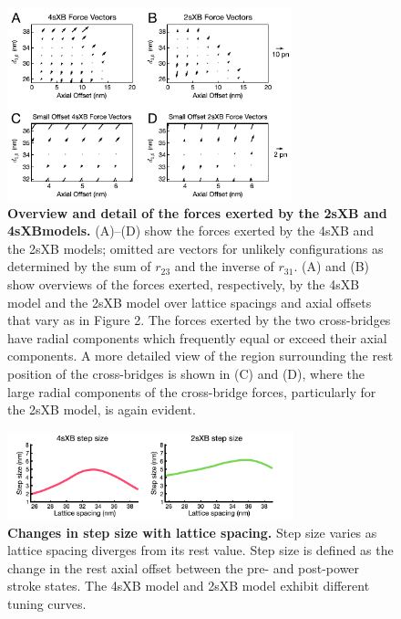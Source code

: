 \documentclass[10pt]{article}
\begin{document}
\clearpage
\begin{figure}[ht]
    \begin{center}
    \includegraphics[width=3.25in]{../imgs/Figure4.pdf}
    \caption{ \textbf{Overview and detail of the forces exerted by the 2sXB and 4sXB\@ models.}
        (A)--(D) show the forces exerted by the 4sXB and the 2sXB models; omitted are vectors for unlikely configurations as determined by the sum of $r_{23}$ and the inverse of $r_{31}$. 
        (A) and (B) show overviews of the forces exerted, respectively, by the 4sXB model and the 2sXB model over lattice spacings and axial offsets that vary as in Figure 2. 
        The forces exerted by the two cross-bridges have radial components which frequently equal or exceed their axial components. 
        A more detailed view of the region surrounding the rest position of the cross-bridges is shown in (C) and (D), where the large radial components of the cross-bridge forces, particularly for the 2sXB model, is again evident.  
        \label{fig_forces}
        }
    \end{center}
\end{figure}

\clearpage
\begin{figure}[ht]
    \begin{center}
    \includegraphics[width=8.3cm]{../imgs/FigureS1.pdf}
    \caption{ \textbf{Changes in step size with lattice spacing.}
        Step size varies as lattice spacing diverges from its rest value.
        Step size is defined as the change in the rest axial offset between the pre- and post-power stroke states. 
        The 4sXB model and 2sXB model exhibit different tuning curves.
        \label{fig_step_size}
           }
    \end{center}
\end{figure}
\end{document}
